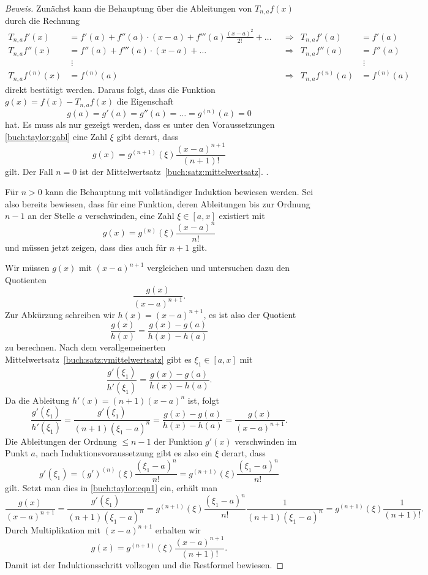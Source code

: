 \begin{proof}[Beweis]
Zunächst kann die Behauptung über die Ableitungen von $T_{n,a}f(x)$ durch
die Rechnung
%
\begin{align*}
T_{n,a}f'(x)
&=
f'(a) + f''(a) \cdot (x-a) + f'''(a)\frac{(x-a)^2}{2!} + \dots
&&\Rightarrow&
T_{n,a}f'(a) 
&=
f'(a)
\\
T_{n,a}f''(x)
&=
f''(a) + f'''(a) \cdot (x-a) + \dots
&&\Rightarrow&
T_{n,a}f''(a) 
&=
f''(a)
\\
&\;\vdots&&&&\;\vdots
\\
T_{n,a}f^{(n)}(x)
&=
f^{(n)}(a)
&&\Rightarrow&
T_{n,a}f^{(n)}(a)
&=
f^{(n)}(a)
\end{align*}
direkt bestätigt werden.
Daraus folgt, dass die Funktion $g(x) = f(x) - T_{n,a}f(x)$ die Eigenschaft
\begin{equation}
g(a) = g'(a) = g''(a) = \dots = g^{(n)}(a)=0
\label{buch:taylor:gabl}
\end{equation}
hat.
Es muss als nur gezeigt werden, dass es unter den Voraussetzungen
\eqref{buch:taylor:gabl} eine Zahl $\xi$ gibt derart, dass
\[
g(x) = g^{(n+1)}(\xi)\frac{(x-a)^{n+1}}{(n+1)!}
\]
gilt.
Der Fall $n=0$ ist der Mittelwertsatz~\ref{buch:satz:mittelwertsatz}.
.

Für $n>0$ kann die Behauptung mit vollständiger Induktion bewiesen werden.
%
%
Sei also bereits bewiesen, dass für eine Funktion, deren Ableitungen bis
zur Ordnung $n-1$ an der Stelle $a$ verschwinden, eine Zahl $\xi\in[a,x]$
existiert mit
\[
g(x) = g^{(n)}(\xi)\frac{(x-a)^n}{n!}
\]
und müssen jetzt zeigen, dass dies auch für $n+1$ gilt.

Wir müssen $g(x)$ mit $(x-a)^{n+1}$ vergleichen und untersuchen
dazu den Quotienten
\[
\frac{g(x)}{(x-a)^{n+1}}.
\]
Zur Abkürzung schreiben wir $h(x) = (x-a)^{n+1}$, es ist also der
Quotient 
\[
\frac{g(x)}{h(x)}
=
\frac{g(x)-g(a)}{h(x)-h(a)}
\]
zu berechnen.
Nach dem verallgemeinerten Mittelwertsatz~\ref{buch:satz:vmittelwertsatz}
gibt es $\xi_1\in[a,x]$ mit
%
\[
\frac{g'(\xi_1)}{h'(\xi_1)}
=
\frac{g(x)-g(a)}{h(x)-h(a)}.
\]
Da die Ableitung $h'(x)=(n+1)(x-a)^n$ ist, folgt
\begin{equation}
\frac{g'(\xi_1)}{h'(\xi_1)}
=
\frac{g'(\xi_1)}{(n+1) (\xi_1-a)^n}
=
\frac{g(x)-g(a)}{h(x)-h(a)}
=
\frac{g(x)}{(x-a)^{n+1}}.
\label{buch:taylor:eqn1}
\end{equation}
Die Ableitungen der Ordnung $\le n-1$ der Funktion $g'(x)$ verschwinden
im Punkt $a$, nach Induktionsvoraussetzung gibt es also ein $\xi$ derart,
dass
%
\[
g'(\xi_1)
=
(g')^{(n)}(\xi) \frac{(\xi_1-a)^{n}}{n!}
=
g^{(n+1)}(\xi)\frac{(\xi_1-a)^n}{n!}
\]
gilt.
Setzt man dies in \eqref{buch:taylor:eqn1} ein, erhält man
\[
\frac{g(x)}{(x-a)^{n+1}}
=
\frac{g'(\xi_1)}{(n+1)(\xi_1-a)^n}
=
g^{(n+1)}(\xi)\frac{(\xi_1-a)^n}{n!} \frac{1}{(n+1)(\xi_1-a)^n}
=
g^{(n+1)}(\xi)\frac{1}{(n+1)!}.
\]
Durch Multiplikation mit $(x-a)^{n+1}$ erhalten wir
\[
g(x) = g^{(n+1)}(\xi)\frac{(x-a)^{n+1}}{(n+1)!}.
\]
Damit ist der Induktionsschritt vollzogen und die Restformel bewiesen.
%
\end{proof}

